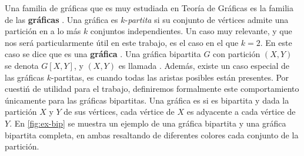 Una familia de gr\'aficas que es muy estudiada en Teor\'ia de Gr\'aficas es la
familia de las \textbf{gr\'aficas }. Una
gr\'afica es $k$-\textit{partita} si su conjunto de v\'ertices admite una
partici\'on en a lo m\'as $k$ conjuntos independientes. Un caso muy relevante, y
que nos ser\'a particularmente \'util en este trabajo, es el caso en el que
$k=2$. En este caso se dice que es una \textbf{gr\'afica}
. Una gr\'afica
bipartita $G$ con partici\'on $(X,Y)$ se denota $G[X,Y]$, y $(X,Y)$ es llamada
. Adem\'as, existe un caso especial de las gr\'aficas
$k$-partitas, es cuando todas las aristas posibles est\'an presentes. Por
cuesti\'n de utilidad para el trabajo, definiremos formalmente este
comportamiento \'unicamente para las gr\'aficas bipartitas. Una gr\'afica es
 si es
bipartita y dada la partici\'on $X$ y $Y$ de sus v\'ertices, cada v\'ertice de
$X$ es adyacente a cada v\'ertice de $Y$. En \cref{fig:ex-bip} se muestra un
ejemplo de una gr\'afica bipartita y una gr\'afica bipartita completa, en ambas
resaltando de diferentes colores cada conjunto de la partici\'on. 

